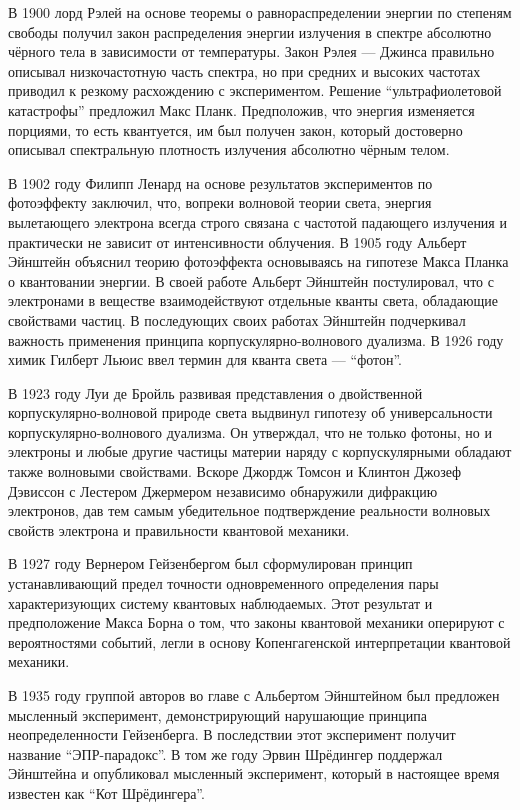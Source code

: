 В 1900 лорд Рэлей на основе теоремы о равнораспределении энергии по степеням свободы 
получил закон распределения энергии излучения в спектре абсолютно чёрного тела в зависимости от температуры. 
Закон Рэлея — Джинса правильно описывал низкочастотную часть спектра,
но при средних и высоких частотах приводил к резкому расхождению с экспериментом.
Решение ``ультрафиолетовой катастрофы'' предложил Макс Планк.
Предположив, что энергия изменяется порциями, то есть квантуется, 
им был получен закон, который достоверно описывал спектральную плотность излучения абсолютно чёрным телом. 

В 1902 году Филипп Ленард на основе результатов экспериментов по фотоэффекту заключил,
что, вопреки волновой теории света, 
энергия вылетающего электрона всегда строго связана с частотой падающего излучения и практически не зависит от интенсивности облучения.
В 1905 году Альберт Эйнштейн объяснил теорию фотоэффекта основываясь на гипотезе Макса Планка о квантовании энергии. 
В своей работе Альберт Эйнштейн постулировал, 
что с электронами в веществе взаимодействуют отдельные кванты света, 
обладающие свойствами частиц.
В последующих своих работах Эйнштейн подчеркивал важность применения принципа корпускулярно-волнового дуализма. 
В 1926 году химик Гилберт Льюис ввел термин для кванта света --- ``фотон''. 

В 1923 году Луи де Бройль развивая представления о двойственной корпускулярно-волновой природе света 
выдвинул гипотезу об универсальности корпускулярно-волнового дуализма. 
Он утверждал, что не только фотоны, но и электроны и любые другие частицы материи наряду с корпускулярными обладают также волновыми свойствами.
Вскоре Джордж Томсон и Клинтон Джозеф Дэвиссон с Лестером Джермером независимо обнаружили дифракцию электронов, дав тем самым убедительное подтверждение реальности волновых свойств электрона и правильности квантовой механики.

В 1927 году Вернером Гейзенбергом был сформулирован принцип устанавливающий предел точности одновременного определения пары характеризующих систему квантовых наблюдаемых. Этот результат и предположение Макса Борна о том,
что законы квантовой механики оперируют с вероятностями событий, 
легли в основу Копенгагенской интерпретации квантовой механики. 
 
В 1935 году группой авторов во главе с Альбертом Эйнштейном был предложен мысленный эксперимент, 
демонстрирующий нарушающие принципа неопределенности Гейзенберга. 
В последствии этот эксперимент получит название ``ЭПР-парадокс''.
В том же году Эрвин Шрёдингер поддержал Эйнштейна
и опубликовал мысленный эксперимент, 
который в настоящее время известен как ``Кот Шрёдингера''. 

